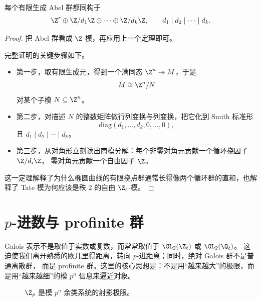 \begin{theorem}
每个有限生成 Abel 群都同构于
\begin{equation}
  \Z^r\oplus \Z/d_1\Z \oplus \cdots \oplus \Z/d_k\Z,
  \qquad d_1\mid d_2\mid \cdots \mid d_k.
\end{equation}
\end{theorem}

\begin{proof}
把 Abel 群看成 $\Z$-模，再应用上一个定理即可。

完整证明的关键步骤如下。
\begin{itemize}
  \item 第一步，取有限生成元，得到一个满同态 $\Z^n\twoheadrightarrow M$，于是
  \[
    M\cong \Z^n/N
  \]
  对某个子模 $N\subseteq \Z^n$。
  \item 第二步，对描述 $N$ 的整数矩阵做行列变换与列变换，把它化到 Smith 标准形
  \[
    \mathrm{diag}(d_1,\dots,d_k,0,\dots,0),
  \]
  且 $d_1\mid d_2\mid \cdots \mid d_k$。
  \item 第三步，从对角形立刻读出商模分解：每个非零对角元贡献一个循环挠因子 $\Z/d_i\Z$，
  零对角元贡献一个自由因子 $\Z$。
\end{itemize}
这一定理解释了为什么椭圆曲线的有限挠点群通常长得像两个循环群的直和，也解释了
Tate 模为何应该是秩 $2$ 的自由 $\Z_\ell$-模。
\end{proof}

\section{$p$-进数与 profinite 群}
\label{sec:app-padic-profinite}

Galois 表示不是取值于实数或复数，而常常取值于 $\GL_2(\Z_\ell)$ 或 $\GL_2(\Q_\ell)$。
这迫使我们离开熟悉的欧几里得距离，转向 $p$-进距离；同时，绝对 Galois 群不是普通离散群，
而是 profinite 群。这里的核心思想是：不是用“越来越大”的极限，而是用“越来越细”的模 $p^n$ 信息来逼近对象。

\begin{figure}[H]
\centering
{}
\caption{$\Z_p$ 是模 $p^n$ 余类系统的射影极限。}
\end{figure}

